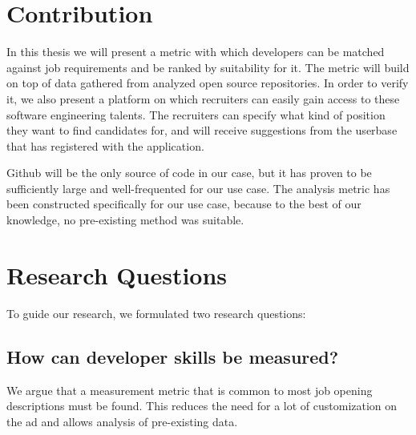 \section{Contribution}
In this thesis we will present a metric with which developers can be matched
against job requirements and be ranked by suitability for it.
The metric will build on top of data gathered from analyzed open source repositories.
In order to verify it, we also present a platform on which recruiters can easily
gain access to these software engineering talents. The recruiters can specify
what kind of position they want to find candidates for, and will receive
suggestions from the userbase that has registered with the application.

Github will be the only source of code in our case, but it has proven
to be sufficiently large and well-frequented for our use case.
The analysis metric has been constructed specifically for our use case,
because to the best of our knowledge, no pre-existing method was suitable.

\section{Research Questions} \label{sec:research-questions}
To guide our research, we formulated two research questions:

\subsection{How can developer skills be measured?}\label{subsec:dev-skill-measurement}
We argue that a measurement metric that is common to most job opening
descriptions must be found. This reduces the need for a lot of customization
on the ad and allows analysis of pre-existing data.
\newline

